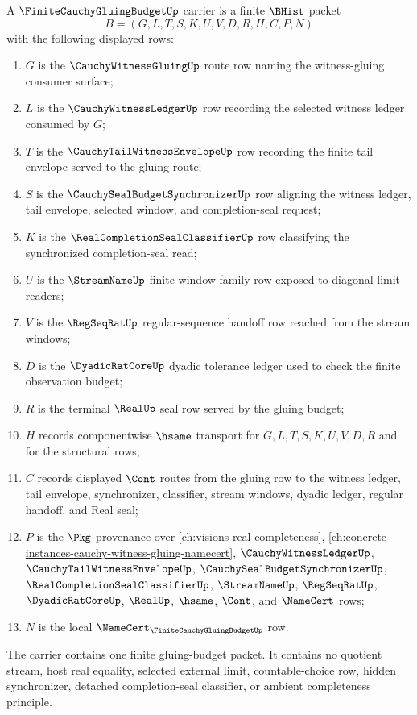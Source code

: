 \begin{definition}
\label{def:finite-cauchy-gluing-budget-carrier}
A $\FiniteCauchyGluingBudgetUp$ carrier is a finite $\BHist$ packet
$$
B=(G,L,T,S,K,U,V,D,R,H,C,P,N)
$$
with the following displayed rows:
\begin{enumerate}
\item $G$ is the $\CauchyWitnessGluingUp$ route row naming the witness-gluing consumer surface;
\item $L$ is the $\CauchyWitnessLedgerUp$ row recording the selected witness ledger consumed by $G$;
\item $T$ is the $\CauchyTailWitnessEnvelopeUp$ row recording the finite tail envelope served to the gluing route;
\item $S$ is the $\CauchySealBudgetSynchronizerUp$ row aligning the witness ledger, tail envelope, selected window, and completion-seal request;
\item $K$ is the $\RealCompletionSealClassifierUp$ row classifying the synchronized completion-seal read;
\item $U$ is the $\StreamNameUp$ finite window-family row exposed to diagonal-limit readers;
\item $V$ is the $\RegSeqRatUp$ regular-sequence handoff row reached from the stream windows;
\item $D$ is the $\DyadicRatCoreUp$ dyadic tolerance ledger used to check the finite observation budget;
\item $R$ is the terminal $\RealUp$ seal row served by the gluing budget;
\item $H$ records componentwise $\hsame$ transport for $G,L,T,S,K,U,V,D,R$ and for the structural rows;
\item $C$ records displayed $\Cont$ routes from the gluing row to the witness ledger, tail envelope, synchronizer, classifier, stream windows, dyadic ledger, regular handoff, and Real seal;
\item $P$ is the $\Pkg$ provenance over \autoref{ch:visions-real-completeness}, \autoref{ch:concrete-instances-cauchy-witness-gluing-namecert}, $\CauchyWitnessLedgerUp$, $\CauchyTailWitnessEnvelopeUp$, $\CauchySealBudgetSynchronizerUp$, $\RealCompletionSealClassifierUp$, $\StreamNameUp$, $\RegSeqRatUp$, $\DyadicRatCoreUp$, $\RealUp$, $\hsame$, $\Cont$, and $\NameCert$ rows;
\item $N$ is the local $\NameCert_{\FiniteCauchyGluingBudgetUp}$ row.
\end{enumerate}
The carrier contains one finite gluing-budget packet. It contains no quotient stream, host real equality, selected external limit, countable-choice row, hidden synchronizer, detached completion-seal classifier, or ambient completeness principle.
\end{definition}

